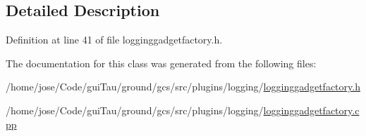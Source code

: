 \subsection{Detailed Description}


Definition at line 41 of file logginggadgetfactory.\-h.



The documentation for this class was generated from the following files\-:\begin{DoxyCompactItemize}
\item 
/home/jose/\-Code/gui\-Tau/ground/gcs/src/plugins/logging/\hyperlink{logginggadgetfactory_8h}{logginggadgetfactory.\-h}\item 
/home/jose/\-Code/gui\-Tau/ground/gcs/src/plugins/logging/\hyperlink{logginggadgetfactory_8cpp}{logginggadgetfactory.\-cpp}\end{DoxyCompactItemize}
